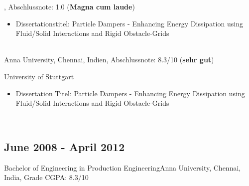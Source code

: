 \documentclass{mycv}
\begin{document}
{\rlap{\color{templateColor4}\rule[0mm]{\textwidth}{\ulinewidth}}}
\begin{paracol}{2}
    \switchcolumn
    {
            , {Abschlussnote: 1.0 ({\bfseries Magna cum
            laude})}
              \begin{itemize}
                  \item Dissertationstitel: Particle Dampers - Enhancing
                      Energy Dissipation using Fluid/Solid Interactions and Rigid
                      Obstacle-Grids
              \end{itemize}
            
            \\
            
             {Anna University, Chennai, Indien, {Abschlussnote:
            8.3/10} ({\bfseries sehr gut})}\\
    
    }
    {
            {University of Stuttgart}
              \begin{itemize}
                  \item Dissertation Titel: Particle Dampers - Enhancing
                      Energy Dissipation using Fluid/Solid Interactions and Rigid
                      Obstacle-Grids
              \end{itemize}
    
            \\
    
            \subsection{June 2008 - April 2012}{Bachelor of Engineering in
                Production Engineering}{Anna University, Chennai, India, {Grade CGPA: 8.3/10}}\\
    }
    

\end{paracol}
\end{document}

